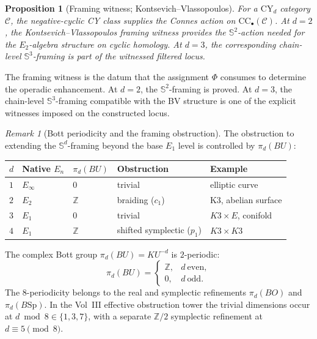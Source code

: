\documentclass[11pt]{article}
\theoremstyle{plain}
\newtheorem{proposition}[theorem]{Proposition}
\theoremstyle{definition}
\theoremstyle{remark}
\newtheorem{remark}[theorem]{Remark}
\newcommand{\cC}{\mathcal{C}}
\newcommand{\bS}{\mathbb{S}}
\newcommand{\bZ}{\mathbb{Z}}
\newcommand{\Sp}{\mathrm{Sp}}
\newcommand{\Eone}{E_1}
\newcommand{\Etwo}{E_2}
\newcommand{\En}{E_n}
\newcommand{\Sd}{\bS^d}
\newcommand{\CC}{\mathrm{CC}}
\newcommand{\CY}{\mathrm{CY}}
\begin{document}
\begin{proposition}[Framing witness; Kontsevich--Vlassopoulos]
\label{prop:v3-st-sd-framing}
For a $\CY_d$ category $\cC$, the negative-cyclic CY class supplies
the Connes action on $\CC_\bullet(\cC)$.  At $d = 2$, the
Kontsevich--Vlassopoulos framing witness provides the $\bS^2$-action
needed for the $\Etwo$-algebra structure on cyclic homology.  At
$d = 3$, the corresponding chain-level $\bS^3$-framing is part of
the witnessed filtered locus.
\end{proposition}

The framing witness is the datum that the assignment $\Phi$ consumes
to determine the operadic enhancement.  At $d = 2$, the
$\bS^2$-framing is proved.  At $d = 3$, the chain-level
$\bS^3$-framing compatible with the BV structure is one of the
explicit witnesses imposed on the constructed locus.

\begin{remark}[Bott periodicity and the framing obstruction]
\label{rem:v3-st-bott-obstruction}
The obstruction to extending the $\Sd$-framing beyond the
base $\Eone$ level is controlled by $\pi_d(BU)$:
\begin{center}
\renewcommand{\arraystretch}{1.2}
\small
\begin{tabular}{lllll}
 \toprule
 $d$ & Native $\En$ & $\pi_d(BU)$ & Obstruction & Example \\
 \midrule
 $1$ & $E_\infty$ & $0$ & trivial & elliptic curve \\
 $2$ & $\Etwo$ & $\bZ$ & braiding ($c_1$) & K3, abelian surface \\
 $3$ & $\Eone$ & $0$ & trivial & $K3 \times E$, conifold \\
 $4$ & $\Eone$ & $\bZ$ & shifted symplectic ($p_1$) & $K3 \times K3$ \\
 \bottomrule
\end{tabular}
\end{center}
The complex Bott group $\pi_d(BU)=KU^{-d}$ is $2$-periodic:
\[
 \pi_d(BU)=\begin{cases}\bZ,&d\ \mathrm{even},\\0,&d\ \mathrm{odd}.
 \end{cases}
\]
The $8$-periodicity belongs to the real and symplectic refinements
$\pi_d(BO)$ and $\pi_d(B\Sp)$.  In the Vol~III effective obstruction
tower the trivial dimensions occur at $d\bmod 8\in\{1,3,7\}$, with
a separate $\bZ/2$ symplectic refinement at $d\equiv5\pmod 8$.
\end{remark}
\end{document}
